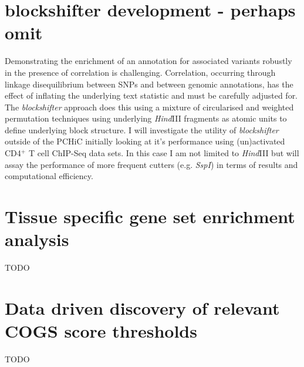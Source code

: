 \documentclass[a4paper,11pt]{report}
\begin{document}

 \section{blockshifter development - perhaps omit}
 
Demonstrating the enrichment of an annotation for associated variants robustly in the presence of correlation is challenging. Correlation, occurring through linkage disequilibrium between SNPs and between genomic annotations,  has the effect of inflating the underlying text statistic and must be carefully adjusted for. The \textit{blockshifter} approach does this using a mixture of circularised and weighted permutation techniques using underlying \textit{Hind}III fragments as atomic units to define underlying block structure. I will investigate the utility of \textit{blockshifter} outside of the PCHiC initially looking at it's performance using (un)activated CD4$^{+}$ T cell ChIP-Seq data sets. In this case I am not limited to \textit{Hind}III but will assay the performance of more frequent cutters (e.g. \textit{SspI}) in terms of results and computational efficiency.

\section{Tissue specific gene set enrichment analysis}
TODO

\section{Data driven discovery of relevant COGS score thresholds}
TODO
\end{document}
